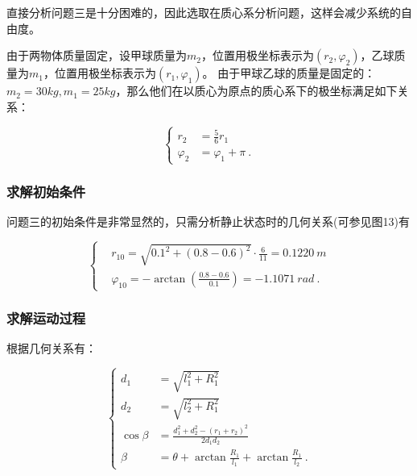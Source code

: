 \documentclass[a4paper,c5size,twoside,UTF8]{ctexart} %
\newcommand{\FS}[2]{\displaystyle\frac{#1}{#2}}
\numberwithin{equation}{section}   %
\begin{document}
直接分析问题三是十分困难的，因此选取在质心系分析问题，这样会减少系统的自由度。

由于两物体质量固定，设甲球质量为$m_2$，位置用极坐标表示为$\left( r_2, \varphi_2\right)$，乙球质量为$m_1$，位置用极坐标表示为$\left( r_1, \varphi_1\right)$。
由于甲球乙球的质量是固定的：$m_2=30kg,m_1=25kg$，那么他们在以质心为原点的质心系下的极坐标满足如下关系：

\begin{equation}
	\left\{
\begin{aligned}
	r_2 &= \FS{5}{6}r_1  \\
	\varphi_2 &= \varphi_1+\pi ~.
   \end{aligned}
   \right.
\end{equation}



\subsubsection{求解初始条件}

问题三的初始条件是非常显然的，只需分析静止状态时的几何关系(可参见图13)有

\begin{equation}
    \left\{
        \begin{aligned}
       &r_{10}=\sqrt{0.1^2+(0.8-0.6)^2}\cdot \frac{6}{11}=0.1220~m \\
        &\varphi_{10}=-\arctan(\frac{0.8-0.6}{0.1})=-1.1071~rad~.
        \end{aligned}
    \right.
\end{equation}


\newpage

\subsubsection{求解运动过程}

根据几何关系有：

\begin{equation}
	\left\{
\begin{aligned}
	d_1&=\sqrt{l_1^2+R_1^2}  \\
	d_2&=\sqrt{l_2^2+R_1^2}  \\
	\cos{\beta}&=\FS{d_1^2+d_2^2-\left(r_1+r_2\right)^2}{2d_1d_2} \\
	\beta&= \theta +\arctan{\FS{R_1}{l_1}}+\arctan{\FS{R_1}{l_2}} ~.
\end{aligned}
    \right.
\end{equation}
\end{document}
